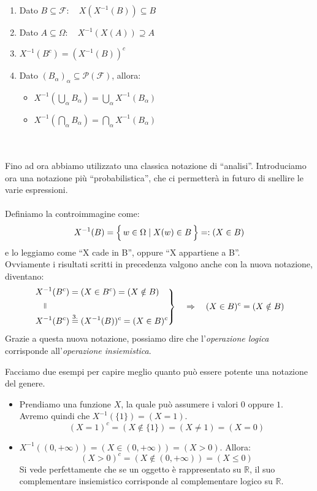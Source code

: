 \begin{enumerate}
    \item Dato $B\subseteq \mathcal{F}: \quad \boxed{X(X^{-1}(B))\subseteq B}$
    \item Dato $A\subseteq \Omega: \quad \boxed{X^{-1}(X(A))\supseteq A}$
    \item $\boxed{X^{-1}(B^c) = (X^{-1}(B))^c}$
    \item Dato $(B_\alpha)_{\alpha}\subseteq \mathcal{P}(\mathcal{F})$, allora:
    \begin{itemize}
        \item $\boxed{X^{-1}\left(\bigcup_{\alpha}B_{\alpha}\right) = \bigcup_\alpha X^{-1}(B_\alpha)}$
        \item $\boxed{X^{-1}\left(\bigcap_{\alpha}B_{\alpha}\right) = \bigcap_\alpha X^{-1}(B_\alpha)}$
    \end{itemize}
\end{enumerate}
\bigskip
\noindent
{}\\
\\
Fino ad ora abbiamo utilizzato una classica notazione di ``analisi''. Introduciamo ora una notazione più ``probabilistica'', che ci permetterà in futuro di snellire le varie espressioni.\\
\\
Definiamo la controimmagine come:
\[X^{-1}(B) = \Bigl\{\,w\in\Omega \mid X(w)\in B\,\Bigr\} = : (X\in B)\]
e lo leggiamo come ``X cade in B'', oppure ``X appartiene a B''.\\
Ovviamente i risultati scritti in precedenza valgono anche con la nuova notazione, diventano:
\[
\left.
\begin{aligned}
    & X^{-1}(B^c) = (X\in B^c) = (X\notin B)\\
    & \quad\verteq \\
    & X^{-1}(B^c) \overset{3.}{=} (X^{-1}(B))^c = (X\in B)^c
\end{aligned}
\right\}
\quad \Rightarrow\quad (X\in B)^c = (X\notin B)
\]
Grazie a questa nuova notazione, possiamo dire che l'\textit{operazione logica} corrisponde all'\textit{operazione insiemistica}.
\begin{esempio}
     Facciamo due esempi per capire meglio quanto può essere potente una notazione del genere.\\
     \begin{itemize}
         \item Prendiamo una funzione $X$, la quale può assumere i valori $0$ oppure $1$. Avremo quindi che $X^{-1}(\{1\}) = (X = 1)$.\\
         \[(X=1)^c = (X\notin \{1\}) = (X\neq1) = (X=0)\]
         \item $X^{-1}((0, +\infty)) = (X\in (0, +\infty)) = (X>0)$. Allora:
         \[(X>0)^c = (X\notin (0, +\infty)) = (X\leq0)\]
         Si vede perfettamente che se un oggetto è rappresentato su $\mathbb{R}$, il suo complementare insiemistico corrisponde al complementare logico su $\mathbb{R}$.
     \end{itemize}
\end{esempio}

